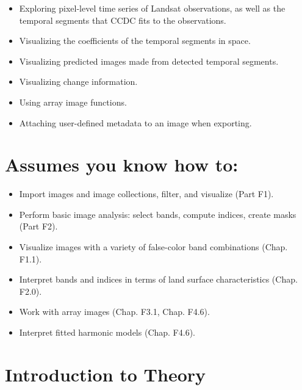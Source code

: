 \documentclass[
  letterpaper,
  DIV=11,
  numbers=noendperiod]{scrreprt}
\providecommand{\tightlist}{%
  \setlength{\itemsep}{0pt}\setlength{\parskip}{0pt}}\usepackage{longtable,booktabs,array}
\begin{document}

\begin{itemize}
\tightlist
\item
  Exploring pixel-level time series of Landsat observations, as well as
  the temporal segments that CCDC fits to the observations.
\item
  Visualizing the coefficients of the temporal segments in space.
\item
  Visualizing predicted images made from detected temporal segments.
\item
  Visualizing change information.
\item
  Using array image functions.
\item
  Attaching user-defined metadata to an image when exporting.
\end{itemize}

\hypertarget{assumes-you-know-how-to-14}{%
\section*{Assumes you know how to:}\label{assumes-you-know-how-to-14}}


\begin{itemize}
\tightlist
\item
  Import images and image collections, filter, and visualize (Part F1).
\item
  Perform basic image analysis: select bands, compute indices, create
  masks (Part F2).
\item
  Visualize images with a variety of false-color band combinations
  (Chap. F1.1).
\item
  Interpret bands and indices in terms of land surface characteristics
  (Chap. F2.0).
\item
  Work with array images (Chap. F3.1, Chap. F4.6).
\item
  Interpret fitted harmonic models (Chap. F4.6).
\end{itemize}

\hypertarget{introduction-to-theory-9}{%
\section{Introduction to Theory~}\label{introduction-to-theory-9}}
\end{document}
